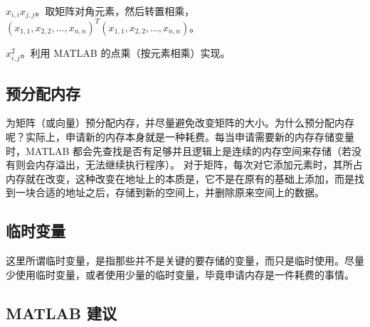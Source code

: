 \begindot
  \item $x_{i,i}x_{j,j}$。取矩阵对角元素，然后转置相乘，$(x_{1,1}, x_{2,2}, \dots, x_{n,n})^T(x_{1,1}, x_{2,2}, \dots, x_{n,n})$。
  \item $x_{i,j}^2$。利用 MATLAB 的点乘（按元素相乘）实现。
\myenddot

\vspace{-0.8cm}


\vspace{-0.8cm}






\subsection{预分配内存}

为矩阵（或向量）预分配内存，并尽量避免改变矩阵的大小。为什么预分配内存呢？实际上，申请新的内存本身就是一种耗费。每当申请需要新的内存存储变量时，MATLAB 都会先查找是否有足够并且逻辑上是连续的内存空间来存储（若没有则会内存溢出，无法继续执行程序）。 对于矩阵，每次对它添加元素时，其所占内存就在改变，这种改变在地址上的本质是，它不是在原有的基础上添加，而是找到一块合适的地址之后，存储到新的空间上，并删除原来空间上的数据。

\vspace{-0.8cm}


\vspace{-0.8cm}






\subsection{临时变量}

这里所谓临时变量，是指那些并不是关键的要存储的变量，而只是临时使用。尽量少使用临时变量，或者使用少量的临时变量，毕竟申请内存是一件耗费的事情。





\subsection{MATLAB 建议}

